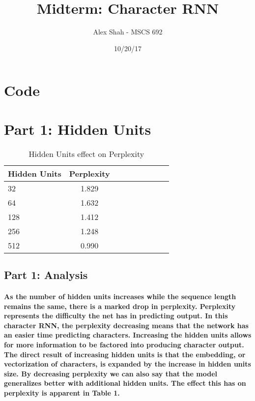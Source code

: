 \documentclass[10pt,a4paper]{report}
\title{Midterm: Character RNN}
\author{Alex Shah - MSCS 692}
\date{10/20/17}
\begin{document}
\lstset{language=Python}
\maketitle

\section{Code}


\clearpage

\section{Part 1: Hidden Units}

\begin{table}[h]
 \caption{Hidden Units effect on Perplexity}
 \label{tbl:aTable}
 \begin{center}
  \begin{tabular}{lccrrrrrr}
    \hline 
	Hidden Units & Perplexity\\
	\hline
	32 & 1.829\\
	64 & 1.632\\
	128 & 1.412\\
	256 & 1.248\\
	512 & 0.990\\
  \end{tabular}
 \end{center}
\end{table}

\subsection{Part 1: Analysis}

\paragraph{
As the number of hidden units increases while the sequence length remains the same, there is a marked drop in perplexity. Perplexity represents the difficulty the net has in predicting output. In this character RNN, the perplexity decreasing means that the network has an easier time predicting characters. Increasing the hidden units allows for more information to be factored into producing character output. The direct result of increasing hidden units is that the embedding, or vectorization of characters, is expanded by the increase in hidden units size. By decreasing perplexity we can also say that the model generalizes better with additional hidden units. The effect this has on perplexity is apparent in Table 1.
}
\
\vspace{5mm}
\end{document}
